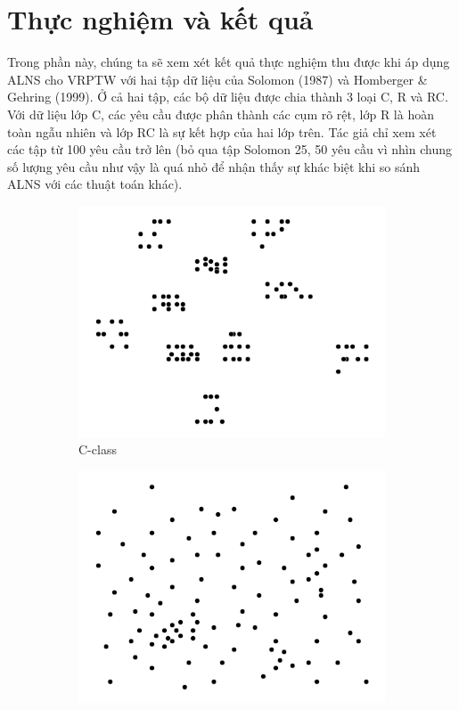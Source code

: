 \chapter{Thực nghiệm và kết quả}

Trong phần này, chúng ta sẽ xem xét kết quả thực nghiệm thu được khi áp dụng ALNS cho VRPTW với hai tập dữ liệu của Solomon (1987) và Homberger \& Gehring (1999). Ở cả hai tập, các bộ dữ liệu được chia thành 3 loại C, R và RC. Với dữ liệu lớp C, các yêu cầu được phân thành các cụm rõ rệt, lớp R là hoàn toàn ngẫu nhiên và lớp RC là sự kết hợp của hai lớp trên. Tác giả chỉ xem xét các tập từ 100 yêu cầu trở lên (bỏ qua tập Solomon 25, 50 yêu cầu vì nhìn chung số lượng yêu cầu như vậy là quá nhỏ để nhận thấy sự khác biệt khi so sánh ALNS với các thuật toán khác).

\begin{figure}[H] %
  \label{fig:perf_ct_c1}
  \begin{subfigure}{.3\textwidth}
    \centering
    \includegraphics[width=1\linewidth]{figures/cls_c.png}
    \caption{C-class}
    \label{fig:cls_c}
  \end{subfigure}%
  \begin{subfigure}{.3\textwidth}
    \centering
    \includegraphics[width=1\linewidth]{figures/cls_r.png}

\end{subfigure}
\end{figure}
